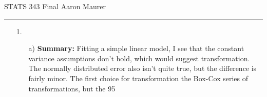 \documentclass[11pt]{article}
\theoremstyle{definition}
\begin{document}
STATS 343 Final \hfill Aaron Maurer
\vspace{2mm}
\hrule
\vspace{2mm}

\begin{itemize}
    \item[1.]
        \begin{itemize}
            \item[a)]
                {\bf Summary:} Fitting a simple linear model, I see that the constant variance assumptions don't hold, which would suggest transformation. The normally distributed error also isn't quite true, but the difference is fairly minor. The first choice for transformation the Box-Cox series of transformations, but the 95%


\end{itemize}
\end{itemize}
\end{document}
